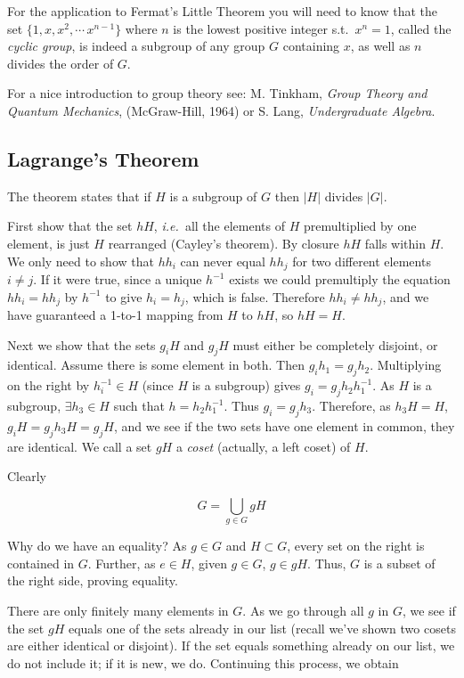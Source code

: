 \documentclass[12pt,letterpaper]{article}
\newcommand\st{\mbox{s.t.\ }}
\newcommand\be{\begin{equation}}
\newcommand\ee{\end{equation}}
\newcommand\ie{{\it i.e.\ }}
\begin{document}
For the application to Fermat's Little Theorem you will need to
know that the set $\{1,x,x^2,\cdots\,x^{n-1}\}$ where $n$ is the
lowest positive integer \st $x^n = 1$, called the {\em cyclic
group}, is indeed a subgroup of any group $G$ containing $x$, as
well as $n$ divides the order of $G$.

For a nice introduction to group theory see: M. Tinkham, {\em
Group Theory and Quantum Mechanics}, (McGraw-Hill, 1964) or S.
Lang, {\em Undergraduate Algebra}.


\subsection{Lagrange's Theorem}

The theorem states that if $H$ is a subgroup of $G$ then $|H|$ divides
$|G|$.

First show that the set $hH$, \ie all the elements of $H$ premultiplied
by one element, is just $H$ rearranged (Cayley's theorem).
By closure $hH$ falls within $H$.
We only need to show that
$h h_i$ can never equal $h h_j$ for two different elements $i\ne j$.
If it were true, since a unique $h^{-1}$ exists we could premultiply
the equation $h h_i = h h_j$ by
$h^{-1}$ to give $h_i = h_j$, which is false. Therefore $h h_i \ne h h_j$,
and we have guaranteed a 1-to-1 mapping from $H$ to $hH$, so $hH = H$.

Next we show that the sets $g_i H$ and $g_j H$ must either be
completely disjoint, or identical. Assume there is some element in
both. Then $g_i h_1 = g_j h_2$. Multiplying on the right by
$h_i^{-1} \in H$ (since $H$ is a subgroup) gives $g_i = g_j h_2
h_1^{-1}$. As $H$ is a subgroup, $\exists h_3 \in H$ such that $h
= h_2 h_1^{-1}$. Thus $g_i = g_j h_3$. Therefore, as $h_3 H = H$,
$g_i H = g_j h_3 H = g_j H$, and we see if the two sets have one
element in common, they are identical. We call a set $gH$ a
\emph{coset} (actually, a left coset) of $H$.

Clearly

\be
G = \bigcup_{g \in G} g H \ee

Why do we have an equality? As $g \in G$ and $H \subset G$, every
set on the right is contained in $G$. Further, as $e \in H$, given
$g \in G$, $g \in gH$. Thus, $G$ is a subset of the right side,
proving equality.

There are only finitely many elements in $G$. As we go through all
$g$ in $G$, we see if the set $gH$ equals one of the sets already
in our list (recall we've shown two cosets are either identical or
disjoint). If the set equals something already on our list, we do
not include it; if it is new, we do. Continuing this process, we
obtain
\end{document}
